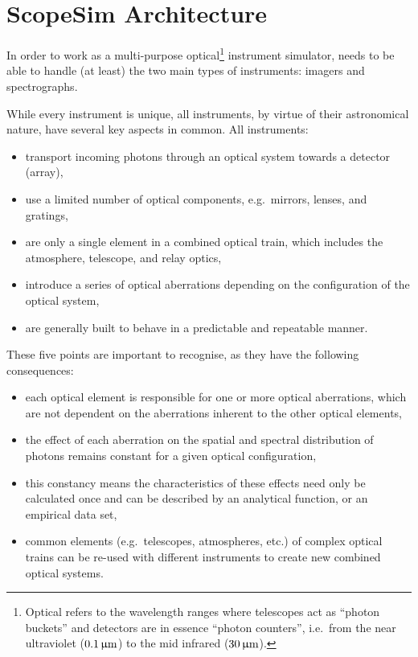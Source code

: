 

\section{ScopeSim Architecture}
\label{scopesim-architecture}

In order to work as a multi-purpose optical\footnote{Optical refers to
  the wavelength ranges where telescopes act as ``photon buckets'' and
  detectors are in essence ``photon counters'', i.e.~from the near
  ultraviolet ($0.1\,\upmu\mathrm{m}$) to the mid infrared ($30\,\upmu\mathrm{m}$).}
instrument simulator, \ScopeSim{} needs to be able to handle (at
least) the two main types of instruments: imagers and spectrographs.

While every instrument is unique, all instruments, by virtue of their
astronomical nature, have several key aspects in common.  All
instruments:

\begin{itemize}
\item transport incoming photons through an optical system towards a
  detector (array),

\item use a limited number of optical components, e.g.\ mirrors,
  lenses, and gratings,

\item are only a single element in a combined optical train, which
  includes the atmosphere, telescope, and relay optics,

\item introduce a series of optical aberrations depending on the
  configuration of the optical system,

\item are generally built to behave in a predictable and repeatable
  manner.
\end{itemize}

These five points are important to recognise, as they have the
following consequences:

\begin{itemize}
\item each optical element is responsible for one or more optical
  aberrations, which are not dependent on the aberrations inherent to
  the other optical elements,

\item the effect of each aberration on the spatial and spectral
  distribution of photons remains constant for a given optical
  configuration,

\item this constancy means the characteristics of these effects need
  only be calculated once and can be described by an analytical
  function, or an empirical data set,

\item common elements (e.g.~telescopes, atmospheres, etc.) of complex
  optical trains can be re-used with different instruments to create
  new combined optical systems.
\end{itemize}

